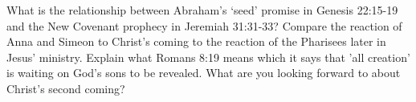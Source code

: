 \begin{questions}
\q What is the relationship between Abraham's `seed' promise in Genesis 22:15-19 and the New Covenant prophecy in Jeremiah 31:31-33?
\q Compare the reaction of Anna and Simeon to Christ's coming to the reaction of the Pharisees later in Jesus' ministry.
\q Explain what Romans 8:19 means which it says that 'all creation' is waiting on God's sons to be revealed.
\q What are you looking forward to about Christ's second coming?
\end{questions}